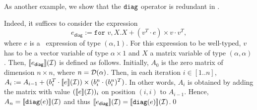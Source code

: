 As another example, we show that the $\texttt{diag}$ operator is redundant in \langfor.
\begin{example}\label{ex:diag}
Indeed, it suffices to consider the expression
$$e_{\mathsf{diag}}:=\texttt{for } v, X. X + (v^T\cdot e) \times v\cdot v^T,$$ where $e$ is a \langfor\  expression of type $(\alpha,1)$. For this expression to be well-typed, $v$ has to be a vector variable of type $\alpha\times 1$ and $X$ a matrix variable of type $(\alpha,\alpha)$. Then, $\llbracket e_{\mathsf{diag}} \rrbracket(\mathcal{I})$ is defined as follows.
Initially, $A_0$ is the zero matrix of dimension $n\times n$, where $n=\mathcal{D}(\alpha)$. Then, in each iteration
$i\in[1..n]$, $A_{i}:=A_{i-1}+  (b_i^T\cdot\llbracket e \rrbracket(\mathcal{I}))\times (b_i^n\cdot (b_i^n)^T)$. In other words, $A_i$ is obtained by adding the matrix with value $(\llbracket e \rrbracket(\mathcal{I}))_i$ on position $(i,i)$ to $A_{i-1}$. Hence, $A_n=\llbracket \texttt{diag}(e) \rrbracket(\mathcal{I})$ and
thus $\llbracket e_{\mathsf{diag}} \rrbracket(\mathcal{I})=\llbracket \texttt{diag}(e) \rrbracket(\mathcal{I})$.\qed%
 \end{example}
%

